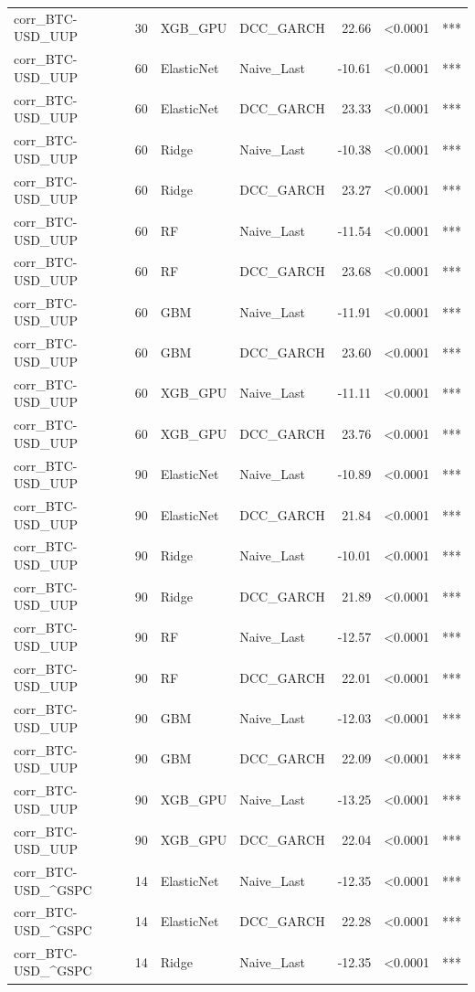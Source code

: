 \begin{table}[H]
\begin{tabular}{llllrrl}
corr_BTC-USD_UUP & 30 & XGB_GPU & DCC_GARCH & 22.66 & <0.0001 & *** \\
corr_BTC-USD_UUP & 60 & ElasticNet & Naive_Last & -10.61 & <0.0001 & *** \\
corr_BTC-USD_UUP & 60 & ElasticNet & DCC_GARCH & 23.33 & <0.0001 & *** \\
corr_BTC-USD_UUP & 60 & Ridge & Naive_Last & -10.38 & <0.0001 & *** \\
corr_BTC-USD_UUP & 60 & Ridge & DCC_GARCH & 23.27 & <0.0001 & *** \\
corr_BTC-USD_UUP & 60 & RF & Naive_Last & -11.54 & <0.0001 & *** \\
corr_BTC-USD_UUP & 60 & RF & DCC_GARCH & 23.68 & <0.0001 & *** \\
corr_BTC-USD_UUP & 60 & GBM & Naive_Last & -11.91 & <0.0001 & *** \\
corr_BTC-USD_UUP & 60 & GBM & DCC_GARCH & 23.60 & <0.0001 & *** \\
corr_BTC-USD_UUP & 60 & XGB_GPU & Naive_Last & -11.11 & <0.0001 & *** \\
corr_BTC-USD_UUP & 60 & XGB_GPU & DCC_GARCH & 23.76 & <0.0001 & *** \\
corr_BTC-USD_UUP & 90 & ElasticNet & Naive_Last & -10.89 & <0.0001 & *** \\
corr_BTC-USD_UUP & 90 & ElasticNet & DCC_GARCH & 21.84 & <0.0001 & *** \\
corr_BTC-USD_UUP & 90 & Ridge & Naive_Last & -10.01 & <0.0001 & *** \\
corr_BTC-USD_UUP & 90 & Ridge & DCC_GARCH & 21.89 & <0.0001 & *** \\
corr_BTC-USD_UUP & 90 & RF & Naive_Last & -12.57 & <0.0001 & *** \\
corr_BTC-USD_UUP & 90 & RF & DCC_GARCH & 22.01 & <0.0001 & *** \\
corr_BTC-USD_UUP & 90 & GBM & Naive_Last & -12.03 & <0.0001 & *** \\
corr_BTC-USD_UUP & 90 & GBM & DCC_GARCH & 22.09 & <0.0001 & *** \\
corr_BTC-USD_UUP & 90 & XGB_GPU & Naive_Last & -13.25 & <0.0001 & *** \\
corr_BTC-USD_UUP & 90 & XGB_GPU & DCC_GARCH & 22.04 & <0.0001 & *** \\
corr_BTC-USD_^GSPC & 14 & ElasticNet & Naive_Last & -12.35 & <0.0001 & *** \\
corr_BTC-USD_^GSPC & 14 & ElasticNet & DCC_GARCH & 22.28 & <0.0001 & *** \\
corr_BTC-USD_^GSPC & 14 & Ridge & Naive_Last & -12.35 & <0.0001 & *** \\

\end{tabular}
\end{table}
